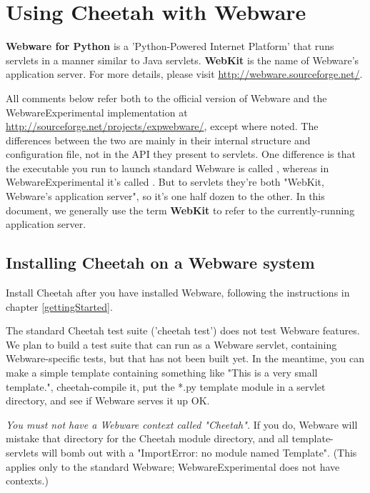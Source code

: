 \section{Using Cheetah with Webware}
\label{webware}

{\bf Webware for Python} is a 'Python-Powered Internet Platform' that runs
servlets in a manner similar to Java servlets.  {\bf WebKit} is the name of
Webware's application server.  For more details, please visit
\url{http://webware.sourceforge.net/}.

All comments below refer both to the official version of Webware and the
WebwareExperimental implementation at 
\url{http://sourceforge.net/projects/expwebware/}, except where noted.  The
differences between the two are mainly in their internal structure and
configuration file, not in the API they present to servlets.  One difference
is that the executable you run to launch standard Webware is called
, whereas in WebwareExperimental it's
called . But to servlets they're both "WebKit, Webware's
application server", so it's one half dozen to the other.  In this document,
we generally use the term {\bf WebKit} to refer to the currently-running
application server.

\subsection{Installing Cheetah on a Webware system}
\label{webware.installing}

Install Cheetah after you have installed Webware, following the instructions in
chapter \ref{gettingStarted}.

The standard Cheetah test suite ('cheetah test') does not test Webware features.
We plan to build a test suite that can run as a Webware servlet, containing
Webware-specific tests, but that has not been built yet.  In the meantime, you
can make a simple template containing something like "This is a very small
template.", cheetah-compile it, put the *.py template module in a servlet
directory, and see if Webware serves it up OK.  

{\em You must not have a Webware context called "Cheetah".}  If you do, Webware
will mistake that directory for the Cheetah module directory, and all 
template-servlets will bomb out with a "ImportError: no module named Template".
(This applies only to the standard Webware; WebwareExperimental does not have
contexts.)

